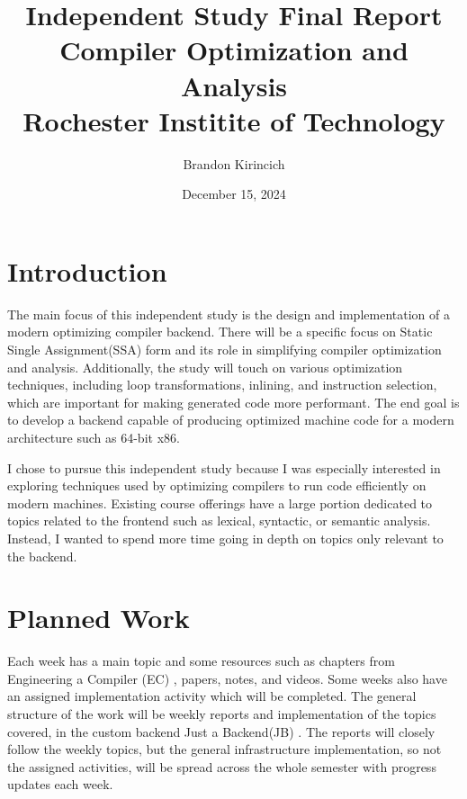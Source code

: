 \documentclass[11pt, a4paper, titlepage]{article}
\begin{document}
\begin{titlepage}
    \title{
        \huge{Independent Study Final Report}\\
        \vspace{0.5cm}
        \Huge{Compiler Optimization and Analysis}\\
        \vspace{0.5cm}
        \Large{Rochester Institite of Technology}
        }
    \author{\Large{Brandon Kirincich}}
    \date{\large{December 15, 2024}}

    \maketitle
\end{titlepage}

\pagebreak
\tableofcontents
\pagebreak

\section{Introduction}
The main focus of this independent study is the design and implementation of a modern optimizing compiler backend.
There will be a specific focus on Static Single Assignment(SSA) form and its role in simplifying compiler optimization and analysis.
Additionally, the study will touch on various optimization techniques, including loop transformations, inlining, and instruction selection, which are important for making generated code more performant.
The end goal is to develop a backend capable of producing optimized machine code for a modern architecture such as 64-bit x86.

I chose to pursue this independent study because I was especially interested in exploring techniques used by optimizing compilers to run code efficiently on modern machines.
Existing course offerings have a large portion dedicated to topics related to the frontend such as lexical, syntactic, or semantic analysis.
Instead, I wanted to spend more time going in depth on topics only relevant to the backend.

\section{Planned Work}
Each week has a main topic and some resources such as chapters from Engineering a Compiler (EC) \cite{ec}, papers, notes, and videos.
Some weeks also have an assigned implementation activity which will be completed.
The general structure of the work will be weekly reports and implementation of the topics covered, in the custom backend Just a Backend(JB) \cite{jcc}.
The reports will closely follow the weekly topics, but the general infrastructure implementation, so not the assigned activities, will be spread across the whole semester with progress updates each week.
\end{document}
